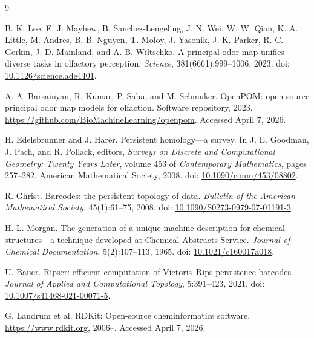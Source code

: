 \documentclass[11pt]{article}
\begin{document}
\begin{thebibliography}{9}

B. K. Lee, E. J. Mayhew, B. Sanchez-Lengeling, J. N. Wei, W. W. Qian, K. A. Little, M. Andres, B. B. Nguyen, T. Moloy, J. Yasonik, J. K. Parker, R. C. Gerkin, J. D. Mainland, and A. B. Wiltschko.
\newblock A principal odor map unifies diverse tasks in olfactory perception.
\newblock \emph{Science}, 381(6661):999--1006, 2023.
\newblock doi: \href{https://doi.org/10.1126/science.ade4401}{10.1126/science.ade4401}.

A. A. Barsainyan, R. Kumar, P. Saha, and M. Schmuker.
\newblock OpenPOM: open-source principal odor map models for olfaction.
\newblock Software repository, 2023.
\newblock \url{https://github.com/BioMachineLearning/openpom}. Accessed April 7, 2026.

H. Edelsbrunner and J. Harer.
\newblock Persistent homology---a survey.
\newblock In J. E. Goodman, J. Pach, and R. Pollack, editors, \emph{Surveys on Discrete and Computational Geometry: Twenty Years Later}, volume 453 of \emph{Contemporary Mathematics}, pages 257--282. American Mathematical Society, 2008.
\newblock doi: \href{https://doi.org/10.1090/conm/453/08802}{10.1090/conm/453/08802}.

R. Ghrist.
\newblock Barcodes: the persistent topology of data.
\newblock \emph{Bulletin of the American Mathematical Society}, 45(1):61--75, 2008.
\newblock doi: \href{https://doi.org/10.1090/S0273-0979-07-01191-3}{10.1090/S0273-0979-07-01191-3}.

H. L. Morgan.
\newblock The generation of a unique machine description for chemical structures---a technique developed at Chemical Abstracts Service.
\newblock \emph{Journal of Chemical Documentation}, 5(2):107--113, 1965.
\newblock doi: \href{https://doi.org/10.1021/c160017a018}{10.1021/c160017a018}.

U. Bauer.
\newblock Ripser: efficient computation of Vietoris--Rips persistence barcodes.
\newblock \emph{Journal of Applied and Computational Topology}, 5:391--423, 2021.
\newblock doi: \href{https://doi.org/10.1007/s41468-021-00071-5}{10.1007/s41468-021-00071-5}.

G. Landrum et al.
\newblock RDKit: Open-source cheminformatics software.
\newblock \url{https://www.rdkit.org}, 2006--.
\newblock Accessed April 7, 2026.

\end{thebibliography}
\end{document}
